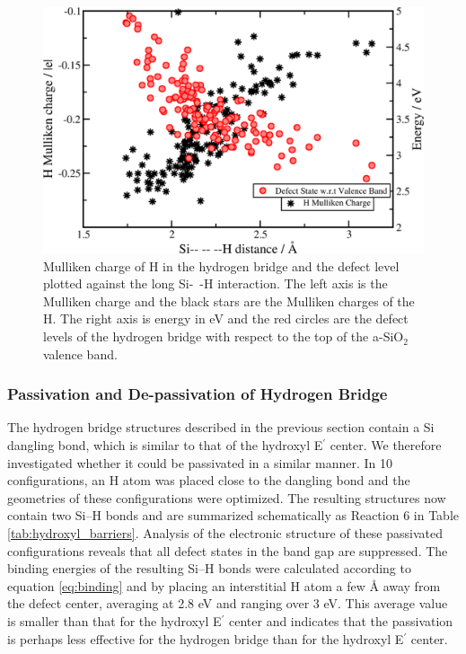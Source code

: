 \documentclass[aps,prb,reprint,superscriptaddress,showpacs]{revtex4-1}
\begin{document}
\begin{figure}[h!]
\includegraphics{hbridge_analysis.png}
\caption{Mulliken charge of H in the hydrogen bridge and the defect level plotted against the long \mbox{Si- -H} interaction. The left axis is the Mulliken charge and the black stars are the Mulliken charges of the H. The right axis is energy in eV and the red circles are the defect levels of the hydrogen bridge with respect to the top of the a-SiO$_2$ valence band.} 
\label{fig:hbridge_correlation}
\end{figure}


\subsubsection{Passivation and De-passivation of Hydrogen Bridge}

The hydrogen bridge structures described in the previous section contain a Si dangling bond, which is similar to that of the hydroxyl E$^\prime$ center. We therefore investigated whether it could be passivated in a similar manner. In 10 configurations, an H atom was placed close to the dangling bond and the geometries of these configurations were optimized. The resulting structures now contain two \mbox{Si--H} bonds and are summarized schematically as Reaction 6 in Table \ref{tab:hydroxyl_barriers}. Analysis of the electronic structure of these passivated configurations reveals that all defect states in the band gap are suppressed. The binding energies of the resulting \mbox{Si--H} bonds were calculated according to equation \ref{eq:binding} and by placing an interstitial H atom a few {\AA} away from the defect center, averaging at 2.8 eV and ranging over 3 eV. This average value is smaller than that for the hydroxyl E$^\prime$ center and indicates that the passivation is perhaps less effective for the hydrogen bridge than for the hydroxyl E$^\prime$ center. 
\end{document}

